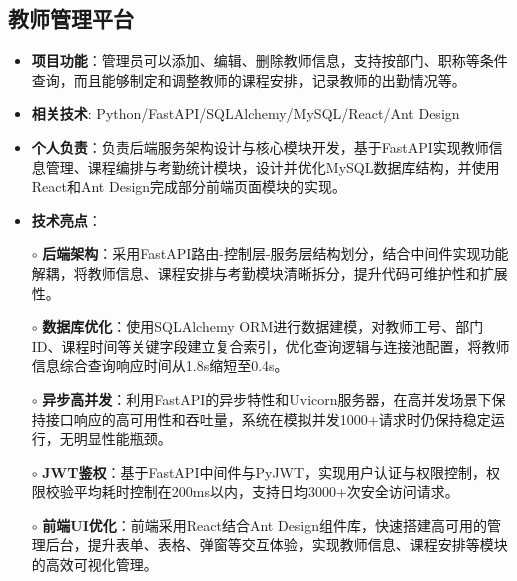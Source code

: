 \subsection{\textbf{教师管理平台} \hspace{2cm}{2024.07 -- 2024.09}}
  \begin{normalsize}
    \begin{itemize}
    \item \textbf{项目功能}：管理员可以添加、编辑、删除教师信息，支持按部门、职称等条件查询，而且能够制定和调整教师的课程安排，记录教师的出勤情况等。
    \item \textbf{相关技术}: Python/FastAPI/SQLAlchemy/MySQL/React/Ant Design
    \item \textbf{个人负责}：负责后端服务架构设计与核心模块开发，基于FastAPI实现教师信息管理、课程编排与考勤统计模块，设计并优化MySQL数据库结构，并使用React和Ant Design完成部分前端页面模块的实现。
    \item \textbf{技术亮点}：
    \setlength{\itemindent}{1em} %
      \item[$\circ$] \textbf{后端架构}：采用FastAPI路由-控制层-服务层结构划分，结合中间件实现功能解耦，将教师信息、课程安排与考勤模块清晰拆分，提升代码可维护性和扩展性。
      \item[$\circ$] \textbf{数据库优化}：使用SQLAlchemy ORM进行数据建模，对教师工号、部门ID、课程时间等关键字段建立复合索引，优化查询逻辑与连接池配置，将教师信息综合查询响应时间从1.8s缩短至0.4s。
      \item[$\circ$] \textbf{异步高并发}：利用FastAPI的异步特性和Uvicorn服务器，在高并发场景下保持接口响应的高可用性和吞吐量，系统在模拟并发1000+请求时仍保持稳定运行，无明显性能瓶颈。
      \item[$\circ$] \textbf{JWT鉴权}：基于FastAPI中间件与PyJWT，实现用户认证与权限控制，权限校验平均耗时控制在200ms以内，支持日均3000+次安全访问请求。
      \item[$\circ$] \textbf{前端UI优化}：前端采用React结合Ant Design组件库，快速搭建高可用的管理后台，提升表单、表格、弹窗等交互体验，实现教师信息、课程安排等模块的高效可视化管理。
    \end{itemize}
  \end{normalsize}